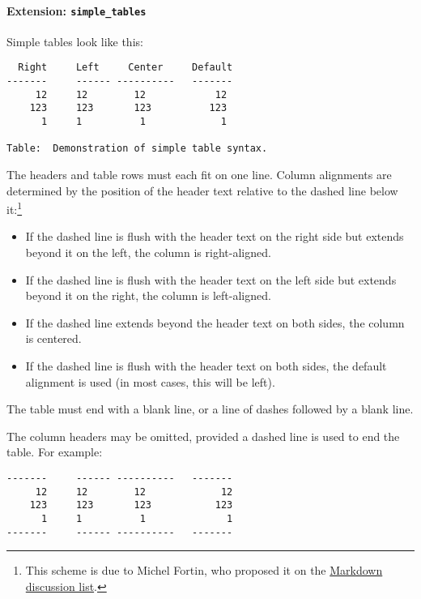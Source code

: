 \documentclass[]{article}
\providecommand{\tightlist}{%
  \setlength{\itemsep}{0pt}\setlength{\parskip}{0pt}}
\let\oldparagraph\paragraph
\renewcommand{\paragraph}[1]{\oldparagraph{#1}\mbox{}}
\begin{document}
\paragraph{\texorpdfstring{Extension:
\texttt{simple\_tables}}{Extension: simple\_tables}}\label{extension-simple_tables}

Simple tables look like this:

\begin{verbatim}
  Right     Left     Center     Default
-------     ------ ----------   -------
     12     12        12            12
    123     123       123          123
      1     1          1             1

Table:  Demonstration of simple table syntax.
\end{verbatim}

The headers and table rows must each fit on one line. Column alignments
are determined by the position of the header text relative to the dashed
line below it:\footnote{This scheme is due to Michel Fortin, who
  proposed it on the
  \href{http://six.pairlist.net/pipermail/markdown-discuss/2005-March/001097.html}{Markdown
  discussion list}.}

\begin{itemize}
\tightlist
\item
  If the dashed line is flush with the header text on the right side but
  extends beyond it on the left, the column is right-aligned.
\item
  If the dashed line is flush with the header text on the left side but
  extends beyond it on the right, the column is left-aligned.
\item
  If the dashed line extends beyond the header text on both sides, the
  column is centered.
\item
  If the dashed line is flush with the header text on both sides, the
  default alignment is used (in most cases, this will be left).
\end{itemize}

The table must end with a blank line, or a line of dashes followed by a
blank line.

The column headers may be omitted, provided a dashed line is used to end
the table. For example:

\begin{verbatim}
-------     ------ ----------   -------
     12     12        12             12
    123     123       123           123
      1     1          1              1
-------     ------ ----------   -------
\end{verbatim}
\end{document}
